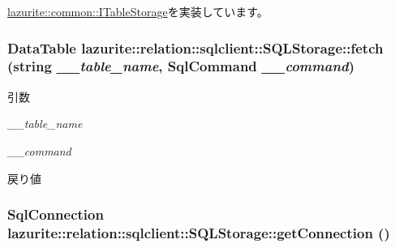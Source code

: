 \hyperlink{interfacelazurite_1_1common_1_1_i_table_storage_a2607a18e5f7931dfc5ecacbc21f077e3}{lazurite::common::ITableStorage}を実装しています。\hypertarget{classlazurite_1_1relation_1_1sqlclient_1_1_s_q_l_storage_ab02cfadf22bbfed1c30cc70463161293}{
\subsubsection[{fetch}]{\setlength{\rightskip}{0pt plus 5cm}DataTable lazurite::relation::sqlclient::SQLStorage::fetch (string {\em \_\-\_\-table\_\-name}, \/  SqlCommand {\em \_\-\_\-command})}}
\label{classlazurite_1_1relation_1_1sqlclient_1_1_s_q_l_storage_ab02cfadf22bbfed1c30cc70463161293}

\begin{DoxyParams}{引数}
\item[{\em \_\-\_\-table\_\-name}]\item[{\em \_\-\_\-command}]\end{DoxyParams}
\begin{DoxyReturn}{戻り値}

\end{DoxyReturn}
\hypertarget{classlazurite_1_1relation_1_1sqlclient_1_1_s_q_l_storage_a808b3cf0fa1b77858d07792d4a6c78d1}{
\subsubsection[{getConnection}]{\setlength{\rightskip}{0pt plus 5cm}SqlConnection lazurite::relation::sqlclient::SQLStorage::getConnection ()}}
\label{classlazurite_1_1relation_1_1sqlclient_1_1_s_q_l_storage_a808b3cf0fa1b77858d07792d4a6c78d1}


